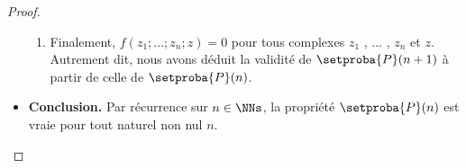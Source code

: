 \begin{proof}
\begin{itemize}[label=\small\textbullet]
\begin{enumerate}
		    \item Finalement, $f(z_1 ; ... ; z_n ; z) = 0$ pour tous complexes $z_1$ , ... , $z_n$ et $z$.
		    Autrement dit, nous avons déduit la validité de $\setproba{P}(n+1)$ à partir de celle de $\setproba{P}(n)$.
		\end{enumerate}
		
		
		\item \textbf{Conclusion.}
		Par récurrence sur $n \in \NNs$, la propriété $\setproba{P}(n)$ est vraie pour tout naturel non nul $n$.
	\end{itemize}

	\null\vspace{-6ex}
\end{proof}

















